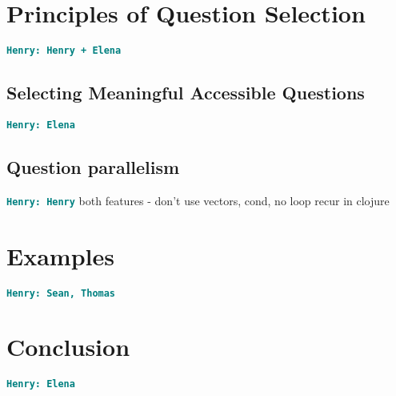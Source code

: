 \documentclass[12pt]{article}
\newcommand{\comment}[1]{{\bf \tt  {#1}}}
\newcommand{\hfcomment}[1]{\textcolor{Teal}{\comment{Henry: {#1}}}}
\begin{document}
	

\section{Principles of Question Selection}\label{sec:select}
	\hfcomment{Henry + Elena}
	\subsection{Selecting Meaningful Accessible Questions}\label{sec:meaning}
	\hfcomment{Elena}
	\subsection{Question parallelism}\label{sec:parallel}
	\hfcomment{Henry}
	both features - don't use vectors, cond, no loop recur in clojure
\section{Examples}\label{sec:examples}
	\hfcomment{Sean, Thomas}

\section{Conclusion}\label{sec:conclusion}
	\hfcomment{Elena}




\end{document}
